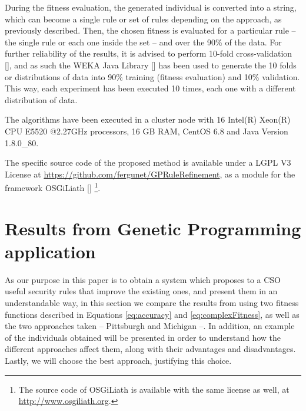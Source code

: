 During the fitness evaluation, the generated individual is converted
into a string, which can become a single rule or set of rules
depending on the approach, as previously described. %
Then, the chosen fitness is evaluated for a particular rule -- the single rule or each one inside the set -- and over the 90\% of the data.
For further reliability of the results, it is advised to perform
10-fold cross-validation [\cite{kohavi1995study}], and as such the WEKA %
Java Library [\cite{HallWEKA09}] has been used to generate the 10 folds
or distributions of data into 90\% training (fitness evaluation) and
10\% validation. This way, each experiment has been executed 10 times,
each one with a different distribution of data.

The algorithms have been executed in a cluster node with 16 Intel(R) Xeon(R) CPU E5520
@2.27GHz processors, 16 GB RAM, CentOS 6.8 and Java Version 1.8.0\_80.

The specific source code of the proposed method is available under a LGPL V3 License 
at \url{https://github.com/fergunet/GPRuleRefinement}, as a module for 
the framework OSGiLiath [\cite{DBLP:journals/soco/Garcia-SanchezGCAG13}] 
\footnote{The source code of OSGiLiath is available with the same
  license  as well, at \url{http://www.osgiliath.org}.}.

\section{Results from Genetic Programming application} 
\label{sec:gp}

As our purpose in this paper is to obtain a system which proposes to a CSO useful security rules that improve the existing ones, and present them in an understandable way, in this section we compare the results from using two fitness functions
described in Equations \ref{eq:accuracy} and \ref{eq:complexFitness}, as well as the two approaches taken -- Pittsburgh and Michigan --. In addition, an example of the individuals obtained will be presented in order to understand how the different approaches affect them, along with
their advantages and disadvantages.
Lastly, we will choose the best
approach, justifying this choice. 

